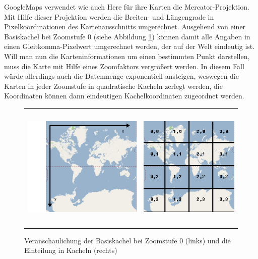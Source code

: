 GoogleMaps verwendet wie auch Here für ihre Karten die Mercator-Projektion. Mit Hilfe dieser Projektion werden die Breiten- und Längengrade in Pixelkoordinationen des Kartenausschnitts umgerechnet. Ausgehend von einer Basiskachel bei Zoomstufe 0 (siehe Abbildung \ref{fig:pixelcoordinates}) können damit alle Angaben in einen Gleitkomma-Pixelwert umgerechnet werden, der auf der Welt eindeutig ist. Will man nun die Karteninformationen um einen bestimmten Punkt darstellen, muss die Karte mit Hilfe eines Zoomfaktors vergrößert werden. In diesem Fall würde allerdings auch die Datenmenge exponentiell ansteigen, weswegen die Karten in jeder Zoomstufe in quadratische Kacheln zerlegt werden, die Koordinaten können dann eindeutigen Kachelkoordinaten zugeordnet werden.\\
\begin{figure}
\centering
\begin{tabular}{@{}cc@{}}
    \includegraphics[height=6cm]{images/pixelCoordinates.png} &
    \includegraphics[height=6cm]{images/tileCoordinates.png} \\
\end{tabular}
\caption{Veranschaulichung der Basiskachel bei Zoomstufe 0 (links) und die Einteilung in Kacheln (rechts)}
\label{fig:pixelcoordinates}
\end{figure}

